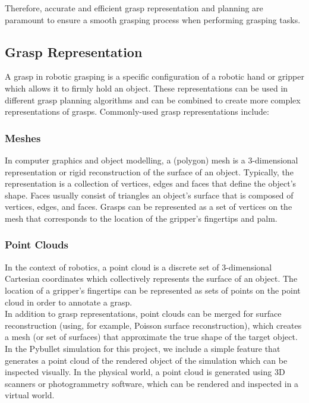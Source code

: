 \documentclass[11pt, a4paper]{report}
\begin{document}
Therefore, accurate and efficient grasp representation and planning are paramount to ensure a smooth grasping process when performing grasping tasks.


\newpage
\subsection{Grasp Representation}
\label{sec:2.1.1}
A grasp in robotic grasping is a specific configuration of a robotic hand or gripper which allows it to firmly hold an object. These representations can be used in different grasp planning algorithms and can be combined to create more complex representations of grasps. Commonly-used grasp representations include: 


\subsubsection{Meshes}
\label{sec:2.1.1.1}
In computer graphics and object modelling, a (polygon) mesh is a 3-dimensional representation or rigid reconstruction of the surface of an object. Typically, the representation is a collection of vertices, edges and faces that define the object's shape. Faces usually consist of triangles an object's surface that is composed of vertices, edges, and faces. Grasps can be represented as a set of vertices on the mesh that corresponds to the location of the gripper's fingertips and palm.


\subsubsection{Point Clouds}
\label{sec:2.1.1.2}
In the context of robotics, a point cloud is a discrete set of 3-dimensional Cartesian coordinates which collectively represents the surface of an object. The location of a gripper's fingertips can be represented as sets of points on the point cloud in order to annotate a grasp.\\

In addition to grasp representations, point clouds can be merged for surface reconstruction (using, for example, Poisson surface reconstruction), which creates a mesh (or set of surfaces) that approximate the true shape of the target object.\\

In the Pybullet simulation for this project, we include a simple feature that generates a point cloud of the rendered object of the simulation which can be inspected visually. In the physical world, a point cloud is generated using 3D scanners or photogrammetry software, which can be rendered and inspected in a virtual world.
\end{document}
